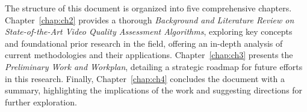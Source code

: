 The structure of this document is organized into five comprehensive chapters. Chapter~\ref{chap:ch2} provides a thorough \textit{Background and Literature Review on State-of-the-Art Video Quality Assessment Algorithms}, exploring key concepts and foundational prior research in the field, offering an in-depth analysis of current methodologies and their applications. Chapter~\ref{chap:ch3} presents the \textit{Preliminary Work and Workplan}, detailing a strategic roadmap for future efforts in this research. Finally, Chapter~\ref{chap:ch4} concludes the document with a summary, highlighting the implications of the work and suggesting directions for further exploration.

